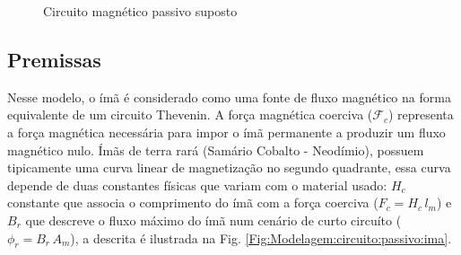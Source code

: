 \begin{figure}[!ht]
	\centering
	\def\svgwidth{1\columnwidth}
	
	\caption{Circuito magnético passivo suposto}
	\label{Fig:Modelagem:circuito:passivo:umlado}
\end{figure}



\subsection{Premissas}

Nesse modelo, o ímã é considerado como uma fonte de fluxo magnético na forma equivalente de um circuito Thevenin. A força magnética coerciva ($\mathcal{F}_c$) representa a força magnética necessária para impor o ímã permanente a produzir um fluxo magnético nulo. Ímãs de terra rará (Samário Cobalto - Neodímio), possuem tipicamente uma curva linear de magnetização no segundo quadrante, essa curva depende de duas constantes físicas que variam com o material usado: $H_c$ constante que associa o comprimento do ímã com a força coerciva ($ F_c = H_c \, l_m$) e $B_r$ que descreve o fluxo máximo do ímã num cenário de curto circuíto ($\phi_r = B_r \, A_m$), a descrita é ilustrada na Fig. \ref{Fig:Modelagem:circuito:passivo:ima}.

